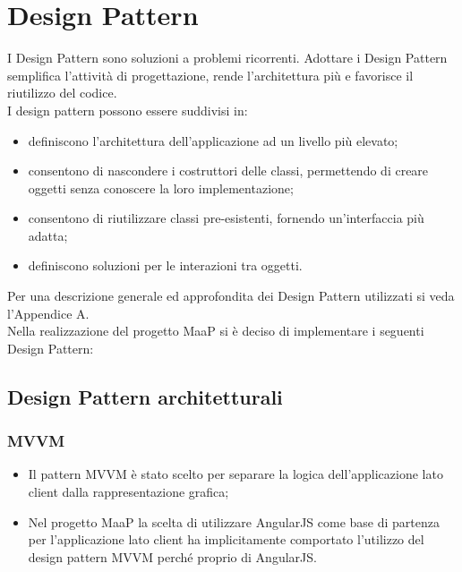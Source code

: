 \newpage
\section{Design Pattern}
I Design Pattern sono soluzioni a problemi ricorrenti. Adottare i Design Pattern semplifica l'attività di progettazione, rende l'architettura più  e favorisce il riutilizzo del codice.\\
I design pattern possono essere suddivisi in:

\begin{itemize}
\item {} definiscono l'architettura dell'applicazione ad un livello più elevato;
\item {} consentono di nascondere i costruttori delle classi, permettendo di creare oggetti senza conoscere la loro implementazione;
\item {} consentono di riutilizzare classi pre-esistenti, fornendo un'interfaccia più adatta;
\item {} definiscono soluzioni per le interazioni tra oggetti.
\end{itemize}
Per una descrizione generale ed approfondita dei Design Pattern utilizzati si veda l'Appendice A.\\
Nella realizzazione del progetto MaaP si è deciso di implementare i seguenti Design Pattern:\\

\subsection{Design Pattern architetturali}
\subsubsection{MVVM}
\begin{itemize}
\item {} Il pattern MVVM è stato scelto per separare la logica dell'applicazione lato client dalla rappresentazione grafica;
\item {} Nel progetto MaaP la scelta di utilizzare AngularJS come base di partenza per l'applicazione lato client ha implicitamente comportato l'utilizzo del design pattern MVVM perché proprio di AngularJS.
\end{itemize}

